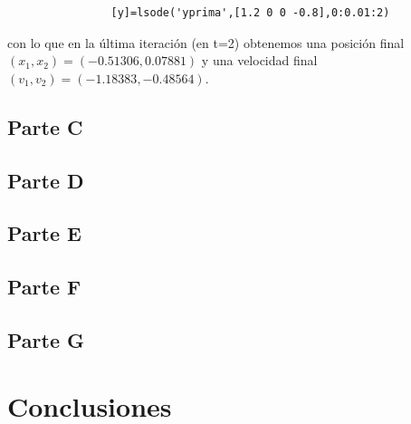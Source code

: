 \documentclass[titlepage,a4paper]{article}
\begin{document}
			\begin{lstlisting}
				[y]=lsode('yprima',[1.2 0 0 -0.8],0:0.01:2)			
			\end{lstlisting}
		con lo que en la última iteración (en t=2) obtenemos una posición final 
		$(x_{1}, x_{2}) = (-0.51306, 0.07881)$ y una velocidad final $(v_{1}, v_{2}) = (-1.18383, -0.48564)$.

	\subsection{Parte C}\label{sec:parteC}
		

	\subsection{Parte D}\label{sec:parteD}

	\subsection{Parte E}\label{sec:parteE}

	\subsection{Parte F}\label{sec:parteF}

	\subsection{Parte G}\label{sec:parteG}

\section{Conclusiones}\label{sec:conc}


\begin{thebibliography}{9} 
	
	 
\end{thebibliography}
\end{document}
